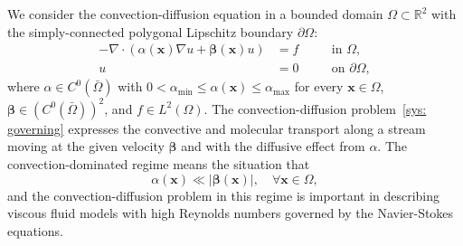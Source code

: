 \documentclass[a4paper]{article}
\theoremstyle{plain}
\theoremstyle{definition}
\numberwithin{equation}{section}
\begin{document}
We consider the convection-diffusion equation in a bounded domain $\Omega\subset\mathbb{R}^2$ with the simply-connected polygonal Lipschitz boundary $\partial\Omega$:
\begin{subequations}\label{sys: governing}
\begin{alignat}{2}
-\nabla\cdot\left(\alpha(\mathbf{x}) \nabla u+\bm{\beta}(\mathbf{x})u\right) & = f && \quad \text{in } \Omega, \label{eqn: governing1} \\
u &= 0 && \quad \text{on } \partial\Omega,  \label{eqn: governing2}
\end{alignat}
\end{subequations}
where $\alpha\in C^0(\bar{\Omega})$ with $0<\alpha_{\text{min}}\leq\alpha(\mathbf{x})\leq \alpha_{\text{max}}$ for every $\mathbf{x}\in \Omega$, $\bm{\beta}\in (C^0(\bar{\Omega}))^2$, and $f\in L^2(\Omega)$.
The convection-diffusion problem~\eqref{sys: governing} expresses the convective and molecular transport along a stream moving at the given velocity $\bm{\beta}$ and with the diffusive effect from $\alpha$.
The convection-dominated regime means the situation that
\begin{equation*}
\alpha(\mathbf{x}) \ll\left|\bm{\beta}(\mathbf{x})\right|,\quad\forall \mathbf{x}\in\Omega,
\end{equation*}
and the convection-diffusion problem in this regime is important in describing viscous fluid models with high Reynolds numbers governed by the Navier-Stokes equations.
\end{document}
